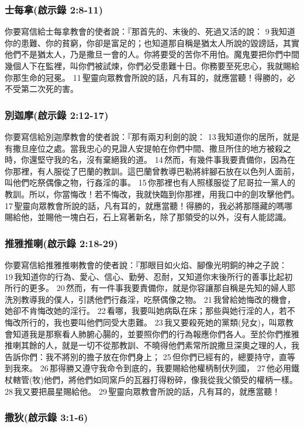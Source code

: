 \subsubsection{士每拿(啟示錄 2:8-11)}
你要寫信給士每拿教會的使者說：『那首先的、末後的、死過又活的說： 9 我知道你的患難、你的貧窮，你卻是富足的；也知道那自稱是猶太人所說的毀謗話，其實他們不是猶太人，乃是撒旦一會的人。你將要受的苦你不用怕。魔鬼要把你們中間幾個人下在監裡，叫你們被試煉，你們必受患難十日。你務要至死忠心，我就賜給你那生命的冠冕。 11 聖靈向眾教會所說的話，凡有耳的，就應當聽！得勝的，必不受第二次死的害。

\subsubsection{別迦摩(啟示錄 2:12-17)}
你要寫信給別迦摩教會的使者說：『那有兩刃利劍的說： 13 我知道你的居所，就是有撒旦座位之處。當我忠心的見證人安提帕在你們中間、撒旦所住的地方被殺之時，你還堅守我的名，沒有棄絕我的道。 14 然而，有幾件事我要責備你，因為在你那裡，有人服從了巴蘭的教訓。這巴蘭曾教導巴勒將絆腳石放在以色列人面前，叫他們吃祭偶像之物，行姦淫的事。 15 你那裡也有人照樣服從了尼哥拉一黨人的教訓。所以，你當悔改！若不悔改，我就快臨到你那裡，用我口中的劍攻擊他們。 17 聖靈向眾教會所說的話，凡有耳的，就應當聽！得勝的，我必將那隱藏的嗎哪賜給他，並賜他一塊白石，石上寫著新名，除了那領受的以外，沒有人能認識。


\subsubsection{推雅推喇(啟示錄 2:18-29)}
你要寫信給推雅推喇教會的使者說：『那眼目如火焰、腳像光明銅的神之子說： 19 我知道你的行為、愛心、信心、勤勞、忍耐，又知道你末後所行的善事比起初所行的更多。 20 然而，有一件事我要責備你，就是你容讓那自稱是先知的婦人耶洗別教導我的僕人，引誘他們行姦淫，吃祭偶像之物。 21 我曾給她悔改的機會，她卻不肯悔改她的淫行。 22 看哪，我要叫她病臥在床；那些與她行淫的人，若不悔改所行的，我也要叫他們同受大患難。 23 我又要殺死她的黨類(兒女)，叫眾教會知道我是那察看人肺腑心腸的，並要照你們的行為報應你們各人。至於你們推雅推喇其餘的人，就是一切不從那教訓、不曉得他們素常所說撒旦深奧之理的人，我告訴你們：我不將別的擔子放在你們身上； 25 但你們已經有的，總要持守，直等到我來。 26 那得勝又遵守我命令到底的，我要賜給他權柄制伏列國， 27 他必用鐵杖轄管(牧)他們，將他們如同窯戶的瓦器打得粉碎，像我從我父領受的權柄一樣。 28 我又要把晨星賜給他。 29 聖靈向眾教會所說的話，凡有耳的，就應當聽！

\subsubsection{撒狄(啟示錄 3:1-6)}

